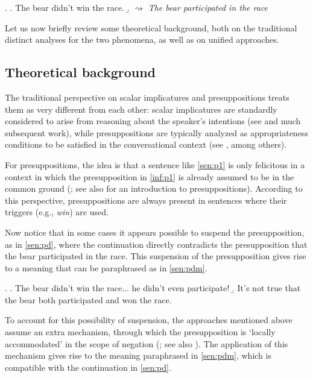 \documentclass[12pt, letterpaper]{article}
\begin{document}
\ex. \label{billpres} \a. \label{sen:p1} The bear didn't win the race. 
\b. \label{inf:p1} $\rightsquigarrow$ \textit{The bear participated in the race}

Let us now briefly review some theoretical background, both on the traditional distinct analyses for the two phenomena, as well as on unified approaches.  

\subsection{Theoretical background}\label{sec:thebac}

The traditional perspective on scalar implicatures and presuppositions treats them as very different from each other: scalar implicatures are standardly considered to arise from reasoning about the speaker's intentions (see \citealt{Grice:1975} and much subsequent work), while presuppositions are typically analyzed as appropriateness conditions to be satisfied in the conversational context (see \citealt{Stalnaker:1974, Karttunen:1974, Heim:1982}, among others). 

For presuppositions, the idea is that a sentence like \ref{sen:p1} is only felicitous in a context in which the presupposition in \ref{inf:p1} is already assumed to be in the common ground (\citealt{Stalnaker:1974, Karttunen:1974, Heim:1982, Heim:1983}; see also \citealt{Beaver:2010} for an introduction to presuppositions). According to this perspective, presuppositions are always present in sentences where their triggers (e.g., \textit{win}) are used. 


Now notice that in some cases it appears possible to suspend the presupposition, as in \ref{sen:pd}, where the continuation directly contradicts the presupposition that the bear participated in the race. This suspension of the presupposition gives rise to a meaning that can be paraphrased as in \ref{sen:pdm}. 

\ex. \a. \label{sen:pd} The bear didn't win the race... he didn't even participate! 
\b. \label{sen:pdm} It's not true that the bear both participated and won the race.

To account for this possibility of suspension, the approaches mentioned above assume an extra mechanism, through which the presupposition is `locally accommodated' in the scope of negation (\citealt{Heim:1983}; see also \citealt{Fintel:2008b}). The application of this mechanism gives rise to the meaning paraphrased in \ref{sen:pdm}, which is compatible with the continuation in \ref{sen:pd}. 
\end{document}
